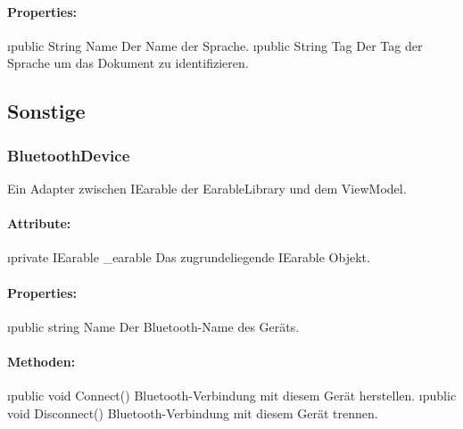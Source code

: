 \documentclass[../entwurf.tex]{subfiles}
\begin{document}
				\paragraph{Properties:}
					\begin{itemize}
						\i{public String Name} Der Name der Sprache.
						\i{public String Tag} Der Tag der Sprache um das Dokument zu identifizieren.
					\end{itemize}
		\subsection{Sonstige}
			\subsubsection{BluetoothDevice}
				Ein Adapter zwischen IEarable der EarableLibrary und dem ViewModel.
				\paragraph{Attribute:}
					\begin{itemize}
						\i{private IEarable \_earable} Das zugrundeliegende IEarable Objekt.
					\end{itemize}
				\paragraph{Properties:}
					\begin{itemize}
						\i{public string Name} Der Bluetooth-Name des Geräts.
					\end{itemize}
				\paragraph{Methoden:}
					\begin{itemize}
						\i{public void Connect()} Bluetooth-Verbindung mit diesem Gerät herstellen.
						\i{public void Disconnect()} Bluetooth-Verbindung mit diesem Gerät trennen.
					\end{itemize}
					
\end{document}
